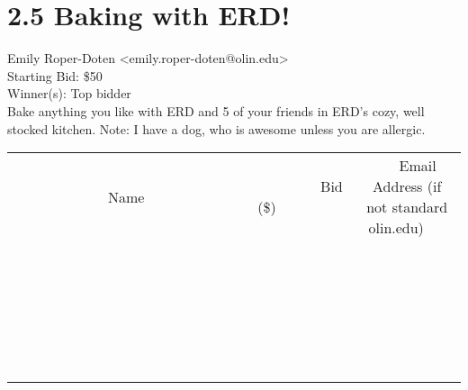 \documentclass[11pt]{article}
\begin{document}
					\section*{2.5 Baking with ERD!}
					Emily Roper-Doten <emily.roper-doten@olin.edu> \\
					Starting Bid: \$50 \\
					Winner(s): Top bidder \\
					Bake anything you like with ERD and 5 of your friends in ERD’s cozy, well stocked kitchen. Note: I have a dog, who is awesome unless you are allergic. \\
					[6ex]
					\begin{tabular}{c c c}
						~~~~~~~~~~~~~Name~~~~~~~~~~~~~ & ~~~~~~~~~Bid (\$)~~~~~~~~~ & ~~~Email Address (if not standard olin.edu)~~~ \\
				
 & & \\
\hline
 & & \\
\hline
 & & \\
\hline
 & & \\
\hline
 & & \\
\hline
 & & \\
\hline
 & & \\
\hline
 & & \\
\hline
 & & \\
\hline
 & & \\
\hline
 & & \\
\hline
 & & \\
\hline
 & & \\
\hline
 & & \\
\hline
 & & \\
\hline
 & & \\
\hline
 & & \\
\hline
 & & \\
\hline
 & & \\
\hline
 & & \\
\hline
 & & \\
\hline
 & & \\
\hline
 & & \\
\hline
 & & \\
\hline
 & & \\
\hline
 & & \\
\hline
					\end{tabular}
					\clearpage
				
\end{document}
